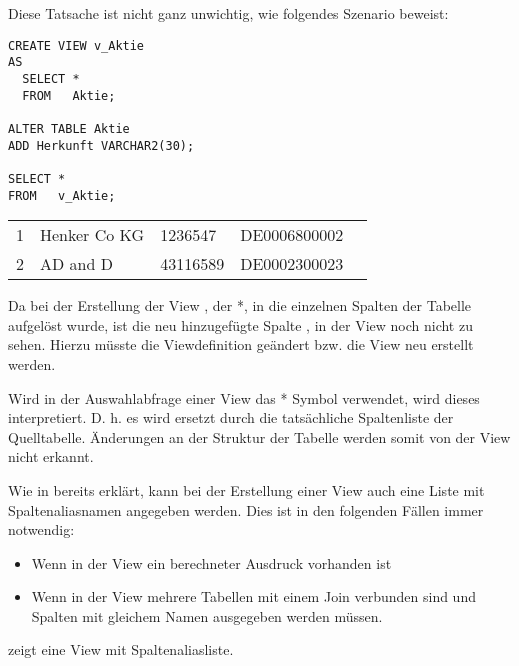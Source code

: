 Diese Tatsache ist nicht ganz unwichtig, wie folgendes Szenario beweist:
\begin{lstlisting}[language=oracle_sql,caption={Eine Szenario mit Tücke},label=sql08_28]
CREATE VIEW v_Aktie
AS
  SELECT *
  FROM   Aktie;

ALTER TABLE Aktie
ADD Herkunft VARCHAR2(30);

SELECT *
FROM   v_Aktie;
        \end{lstlisting}
\clearpage
\begin{center}
    \begin{small}
        \tablehead{}
        \begin{msoraclesql}
            \begin{supertabular}{rllll}
                1 & Henker Co KG & 1236547 & DE0006800002  \\
                2 & AD and D & 43116589 & DE0002300023  \\
            \end{supertabular}
        \end{msoraclesql}
    \end{small}
\end{center}
Da bei der Erstellung der View , der *, in die einzelnen Spalten der Tabelle  aufgelöst wurde, ist die neu hinzugefügte Spalte , in der View  noch nicht zu sehen. Hierzu müsste die Viewdefinition geändert bzw. die View neu erstellt werden.

\begin{merke}
    Wird in der Auswahlabfrage einer View das * Symbol verwendet, wird dieses interpretiert. D. h. es wird ersetzt durch die tatsächliche Spaltenliste der Quelltabelle. Änderungen an der Struktur der Tabelle werden somit von der View nicht erkannt.
\end{merke}
Wie in  bereits erklärt, kann bei der Erstellung einer View auch eine Liste mit Spaltenaliasnamen angegeben werden. Dies ist in den folgenden Fällen immer notwendig:
\begin{itemize}
    \item Wenn in der View ein berechneter Ausdruck vorhanden ist
    \item Wenn in der View mehrere Tabellen mit einem Join verbunden sind und Spalten mit gleichem Namen ausgegeben werden müssen.
\end{itemize}
 zeigt eine View mit Spaltenaliasliste.

